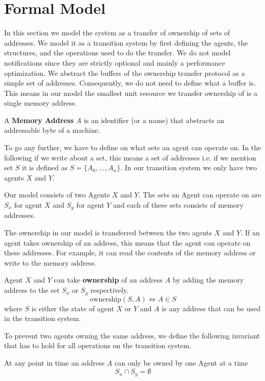 \documentclass[a4paper,11pt,twoside]{report}
\begin{document}
	\chapter{Formal Model}
	In this section we model the system as a transfer of ownership of sets of addresses. We model it as a 
	transition system by first defining the agents, the structures, 
	and the operations used to do the transfer. We do not model notifications since they are strictly optional
	and mainly a performance optimization. We abstract the buffers 
	of the ownership transfer protocol as a simple set of addresses. Consequently, we do not need to 
	define what a buffer is. This means in our model the smallest unit resource we transfer ownership 
	of is a single memory address. 
	\\
	\begin{defi}
		A \textbf{Memory Address} \textit{A} is an identifier (or a name) that abstracts 
		an addressable byte of a machine. 
	\end{defi}
	
	To go any further, we have to define on what sets an agent can operate on. In the following
	if we write about a set, this means a set of addresses i.e. if we mention set $S$ it 
	is defined as $S = \{A_0, ..., A_n\}$.
    In our transition system we only have two agents $X$ and $Y$.
	\\
	\begin{defi}
		Our model consists of two Agents $X$ and $Y$. 
		The sets an Agent can operate on are $S_x$ for agent $X$ and $S_y$ for agent $Y$ and
		each of these sets consists of memory addresses.
	\end{defi}
	
	The ownership in our model is transferred between the two agents $X$ and $Y$. 
	If an agent takes ownership of an address, this means that the agent can operate 
	on these addresses. For example, it can read the 
	contents of the memory address or write to the memory address. 
	\\
	\begin{defi}[Ownership]	
		Agent $X$ and $Y$ can take \textbf{ownership} of an address $A$ by adding the memory address to the set $S_x$ or $S_y$ respectively.
		\[ \text{ownership}(S, A) \Leftrightarrow A \in S \] 
		where $S$ is either the state of agent $X$ or $Y$ and $A$ is any address that can be used in the transition system. 
	\end{defi}
	
	To prevent two agents owning the same address, we define the following invariant that 
	has to hold for all operations on the transition system.
	\\
	\begin{inv}
		At any point in time an address $A$ can only be owned by one Agent at a time
		\[ S_x \cap S_y = \emptyset \]
	\end{inv}	
	
\end{document}
